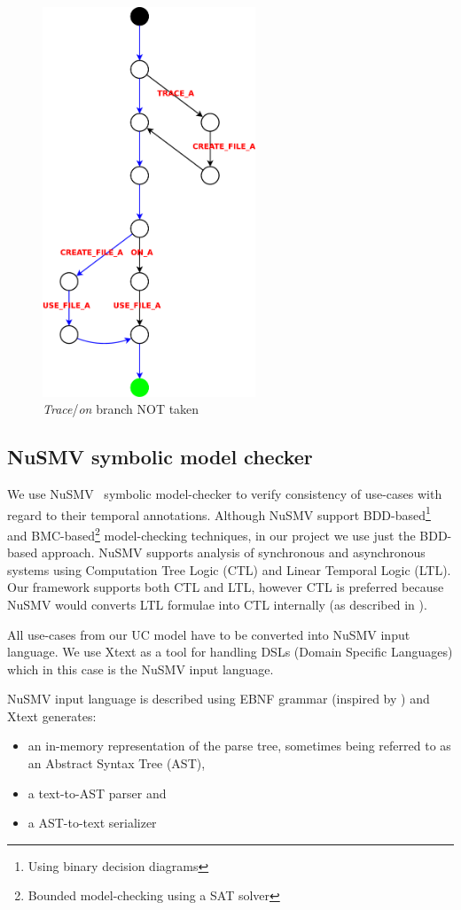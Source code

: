 \begin{figure}[ht]
  \centering
  \includegraphics[width=180pt]{images/traceTest_path_not_taken}
  \caption{\emph{Trace}/\emph{on} branch NOT taken}
  \label{fig:traceTestNotTaken}
\end{figure}

\subsection{NuSMV symbolic model checker}

We use NuSMV~\cite{NuSMV-CAV02,NuSMV-frocos02} symbolic model-checker to verify consistency of use-cases with regard to their temporal annotations.
Although NuSMV support BDD-based\footnote{Using binary decision diagrams} and BMC-based\footnote{Bounded model-checking using a SAT solver} model-checking techniques, in our project we use just the BDD-based approach.
NuSMV supports analysis of synchronous and asynchronous systems using Computation Tree Logic (CTL) and Linear Temporal Logic (LTL).
Our framework supports both CTL and LTL, however CTL is preferred because NuSMV would converts LTL formulae into CTL internally (as described in \cite{NuSMV-ltl-fmsd97}).

All use-cases from our UC model have to be converted into NuSMV input language.
We use Xtext\cite{Xtext-website} as a tool for handling DSLs (Domain Specific Languages) which in this case is the NuSMV input language.

NuSMV input language is described using EBNF grammar (inspired by \cite{googlecode-nusmv-tools}) and Xtext generates:
\begin{itemize}
  \item an in-memory representation of the parse tree, sometimes being referred to as an Abstract Syntax Tree (AST),
  \item a text-to-AST parser and
  \item a AST-to-text serializer
\end{itemize}

